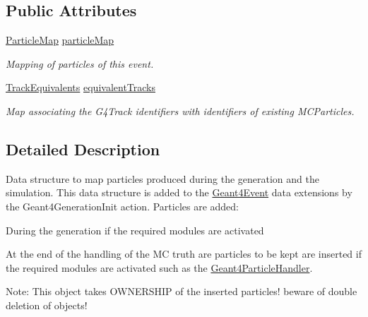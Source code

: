 \subsection*{Public Attributes}
\begin{DoxyCompactItemize}
\item 
\hyperlink{class_d_d4hep_1_1_simulation_1_1_geant4_particle_map_a065c5fb0629285022b9aa2a628bffef3}{ParticleMap} \hyperlink{class_d_d4hep_1_1_simulation_1_1_geant4_particle_map_ac5be2ea78909ee55da8e4008c4f727a0}{particleMap}
\begin{DoxyCompactList}\small\item\em Mapping of particles of this event. \item\end{DoxyCompactList}\item 
\hyperlink{class_d_d4hep_1_1_simulation_1_1_geant4_particle_map_aba09f5fcb2dd5874d129660ad4454a21}{TrackEquivalents} \hyperlink{class_d_d4hep_1_1_simulation_1_1_geant4_particle_map_a61cdcde928de729988141a9cf643e9ad}{equivalentTracks}
\begin{DoxyCompactList}\small\item\em Map associating the G4Track identifiers with identifiers of existing MCParticles. \item\end{DoxyCompactList}\end{DoxyCompactItemize}


\subsection{Detailed Description}
Data structure to map particles produced during the generation and the simulation. This data structure is added to the \hyperlink{class_d_d4hep_1_1_simulation_1_1_geant4_event}{Geant4Event} data extensions by the Geant4GenerationInit action. Particles are added:
\begin{DoxyItemize}
\item During the generation if the required modules are activated
\item At the end of the handling of the MC truth are particles to be kept are inserted if the required modules are activated such as the \hyperlink{class_d_d4hep_1_1_simulation_1_1_geant4_particle_handler}{Geant4ParticleHandler}.
\end{DoxyItemize}

Note: This object takes OWNERSHIP of the inserted particles! beware of double deletion of objects!

